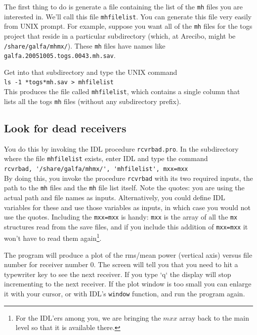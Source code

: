 \documentclass[psfig,preprint]{aastex}
\begin{document}
	The first thing to do is generate a file containing the list of
the \verb$mh$ files you are interested in.  We'll call this file
\verb$mhfilelist$.  You can generate this file very easily from UNIX
prompt.  For example, suppose you want all of the \verb$mh$ files for
the togs project that reside in a particular subdirectory (which,
at Arecibo, might be \verb$/share/galfa/mhmx/$).  These \verb$mh$ files
have names like \verb$galfa.20051005.togs.0043.mh.sav$. 

	Get into that subdirectory and type the UNIX command \\
\verb$ls -1 *togs*mh.sav > mhfilelist$ \\
This produces the file called \verb$mhfilelist$, which contains
a single column that lists all the togs \verb$mh$ files (without
any subdirectory prefix). 

\subsection{Look for dead receivers} \label{rcvrbad}

	You do this by invoking the IDL procedure \verb$rcvrbad.pro$.
In the subdirectory where the file \verb$mhfilelist$ exists, enter IDL 
and type the command \\
\verb$rcvrbad, '/share/galfa/mhmx/', 'mhfilelist', mxx=mxx$ \\
By doing
this, you invoke the procedure \verb$rcvrbad$ with its two required
inputs, the path to the \verb$mh$ files and the \verb$mh$ file list
itself. Note the quotes: you are using the actual path and file names as
inputs. Alternatively, you could define IDL variables for these and use
those variables as inputs, in which case you would not use the quotes.
Including the \verb$mxx=mxx$ is handy: \verb$mxx$ is the array of all
the \verb$mx$ structures read from the save files, and if you include
this addition of \verb$mxx=mxx$ it won't have to read them
again\footnote{For the IDL'ers among you, we are bringing the $mxx$
array back to the main level so that it is available there.}.

	The program will produce a plot of the rms/mean power (vertical
axis) versus file number for receiver number 0.  The screen will tell
you that you need to hit a typewriter key to see the next receiver.  If
you type `q` the display will stop incrementing to the next receiver. 
If the plot window is too small you can enlarge it with your cursor, or
with IDL's \verb$window$ function, and run the program again. 
\end{document}
